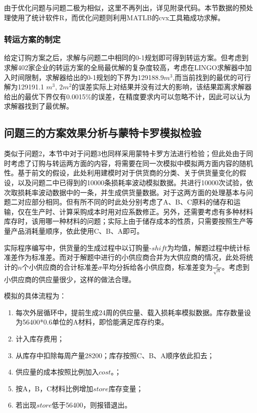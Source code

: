 \documentclass{my_paper}
\begin{document}
由于优化问题与问题二极为相似，这里不再列出，详见附录代码。本节数据的预处理使用了统计软件R，而优化问题则利用MATLB的cvx工具箱成功求解。

\subsubsection{转运方案的制定}

给定订购方案之后，求解与问题二中相同的0-1规划即可得到转运方案。但考虑到求解402家企业的转运方案的全局最优解的复杂度较高，考虑在LINGO求解器中加入时间限制，求解器给出的0-1规划的下界为129188.9$m^3$,而当前找到的最优的可行解为129191.1 $m^3$, 2$m^2$的误差实际上对结果并没有过大的影响，该结果距离求解器给出的最优下界仅有0.0015\%的误差，在精度要求内可以忽略不计，因此可以认为求解器找到了最优解。

\subsection{问题三的方案效果分析与蒙特卡罗模拟检验}
类似于问题2，本节中对于问题3也同样采用蒙特卡罗方法进行检验；但此处由于同时考虑了订购与转运两方面的内容，将需要在同一次模拟中模拟两方面内容的随机性。基于前文的假设，此处利用建模时对于供货商的分类、关于供货量变化的假设，以及问题二中已得到的10000条损耗率波动模拟数据。共进行10000次试验，依次取损耗率波动数据中的一条，并生成供货量数据。对于这两方面的处理基本与问题二对应部分相同。但有所不同的时此处分别考虑了A、B、C原料的储存和运输，仅在生产时、计算采购成本时用对应系数修正。另外，还需要考虑有多种材料库存时，该用哪一种材料的问题；实际上由于储存成本的性质，只需要按照生产等量产品消耗量顺序，依此使用C、B、A即可。

实际程序编写中，供货量的生成过程中以订购量-$shift$为均值，解题过程中统计标准差作为标准差。而对于解题中进行的小供应商合并为大供应商的情况，此处将统计的$n$个小供应商的合计标准差$\sigma$平均分拆给各小供应商，标准差变为$\frac{\sigma}{\sqrt{n}}$。考虑到小供应商的供应量很少，这样的做法合理。

模拟的具体流程为：
\begin{enumerate}
\item 每次外层循环中，提前生成24周的供应量、载入损耗率模拟数据。库存数量设为56400*0.6单位的A材料，即恰能满足库存约束。
\item 计入库存费用；
\item 从库存中扣除每周产量28200；库存按照C、B、A顺序依此扣去；
\item 供应量的成本按照比例加入$cost$。；
\item 按A，B，C材料比例增加$store$库存变量；
\item 若出现$store$低于56400，则报错退出。
\end{enumerate}
\end{document}
